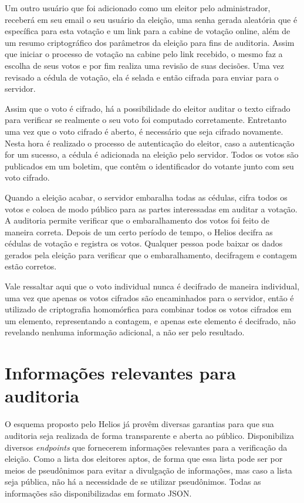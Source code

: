 \documentclass{ufsctex/ufsctex}
\begin{document}
Um outro usuário que foi adicionado como um eleitor pelo administrador,
receberá em seu email o seu usuário da eleição, uma senha gerada aleatória que
é específica para esta votação e um link para a cabine de votação online, além
de um resumo criptográfico dos parâmetros da eleição para fins de auditoria.
Assim que iniciar o processo de votação na cabine pelo link recebido, o mesmo
faz a escolha de seus votos e por fim realiza uma revisão de suas decisões. Uma
vez revisado a cédula de votação, ela é selada e então cifrada para enviar para
o servidor.

Assim que o voto é cifrado, há a possibilidade do eleitor auditar o texto
cifrado para verificar se realmente o seu voto foi computado corretamente.
Entretanto uma vez que o voto cifrado é aberto, é necessário que seja cifrado
novamente. Nesta hora é realizado o processo de autenticação do eleitor, caso a
autenticação for um sucesso, a cédula é adicionada na eleição pelo servidor.
Todos os votos são publicados em um boletim, que contêm o identificador do
votante junto com seu voto cifrado.

Quando a eleição acabar, o servidor embaralha todas as cédulas, cifra todos os
votos e coloca de modo público para as partes interessadas em auditar a
votação. A auditoria permite verificar que o embaralhamento dos votos foi feito
de maneira correta. Depois de um certo período de tempo, o Helios decifra as
cédulas de votação e registra os votos. Qualquer pessoa pode baixar os dados
gerados pela eleição para verificar que o embaralhamento, decifragem e contagem
estão corretos.

Vale ressaltar aqui que o voto individual nunca é decifrado de maneira
individual, uma vez que apenas os votos cifrados são encaminhados para o
servidor, então é utilizado de criptografia homomórfica para combinar todos os
votos cifrados em um elemento, representando a contagem, e apenas este elemento
é decifrado, não revelando nenhuma informação adicional, a não ser pelo
resultado.

\section{Informações relevantes para auditoria}


O esquema proposto pelo Helios já provêm diversas garantias para que sua
auditoria seja realizada de forma transparente e aberta ao público.
Disponibiliza diversos \textit{endpoints} que fornecerem informações relevantes
para a verificação da eleição. Como a lista dos eleitores aptos, de forma que
essa lista pode ser por meios de pseudônimos para evitar a divulgação de
informações, mas caso a lista seja pública, não há a necessidade de se utilizar
pseudônimos. Todas as informações são disponibilizadas em formato JSON.
\end{document}
